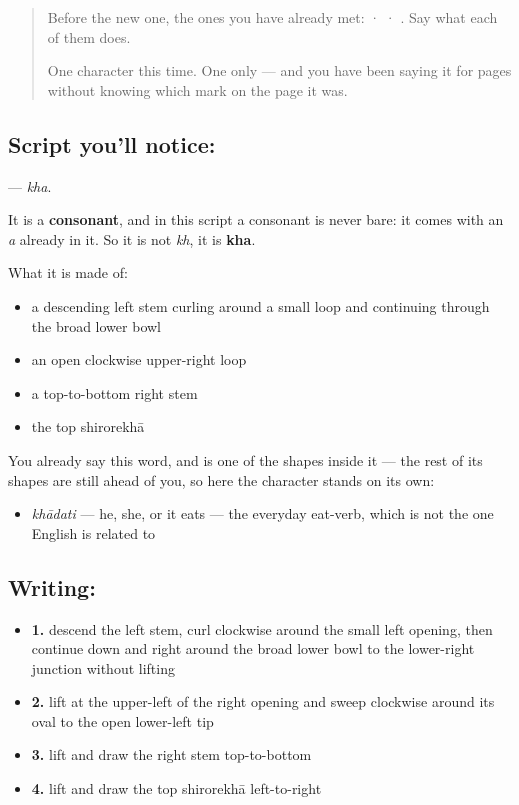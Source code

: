 \label{lesson:SA-S119-letter-kha}



\begin{quote}
Before the new one, the ones you have already met:  ·  · . Say what each of them does.

One character this time. One only — and you have been saying it for pages without knowing which mark on the page it was.
\end{quote}

\subsection*{Script you'll notice: }
\textbf{} — \emph{kha}.

It is a \textbf{consonant}, and in this script a consonant is never bare: it comes with an \emph{a} already in it. So it is not \emph{kh}, it is \textbf{kha}.

What it is made of:

\begin{itemize}
\raggedright
  \item a descending left stem curling around a small loop and continuing through the broad lower bowl
  \item an open clockwise upper-right loop
  \item a top-to-bottom right stem
  \item the top shirorekhā
\end{itemize}

You already say this word, and  is one of the shapes inside it — the rest of its shapes are still ahead of you, so here the character stands on its own:

\begin{itemize}
\raggedright
  \item \emph{khādati} — he, she, or it eats — the everyday eat-verb, which is not the one English is related to
\end{itemize}

\subsection*{Writing: }

\begin{itemize}
\raggedright
  \item \textbf{1.} descend the left stem, curl clockwise around the small left opening, then continue down and right around the broad lower bowl to the lower-right junction without lifting
  \item \textbf{2.} lift at the upper-left of the right opening and sweep clockwise around its oval to the open lower-left tip
  \item \textbf{3.} lift and draw the right stem top-to-bottom
  \item \textbf{4.} lift and draw the top shirorekhā left-to-right
\end{itemize}


